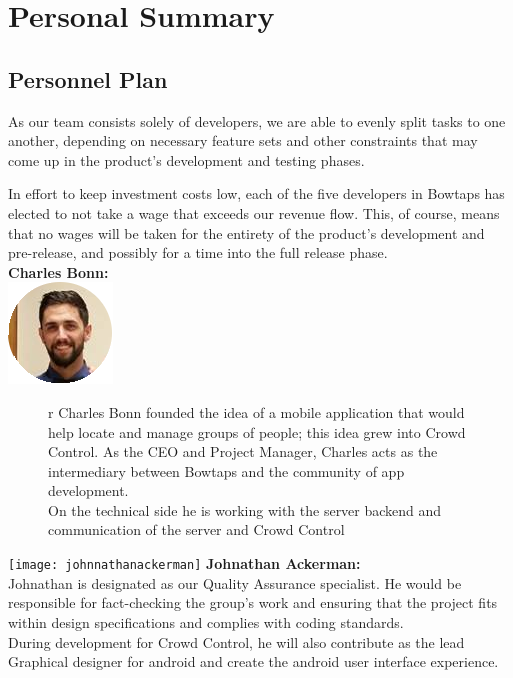 
\graphicspath{ {./Pictures/} }

\chapter{Personal Summary}

\section{Personnel Plan}

As our team consists solely of developers, we are able to evenly split tasks to one another, depending on necessary feature sets and other constraints that may come up in the product’s development and testing phases.

In effort to keep investment costs low, each of the five developers in Bowtaps has elected to not take a wage that exceeds our revenue flow. This, of course, means that no wages will be taken for the entirety of the product’s development and pre-release, and possibly for a time into the full release phase.\\





\noindent
\textbf{Charles Bonn:}\\ 
\includegraphics{charlesbonn}
\begin{figure}{r}
Charles Bonn founded the idea of a mobile application that would help locate and manage groups of people; this idea grew into Crowd Control. As the CEO and Project Manager, Charles acts as the intermediary between Bowtaps and the community of app development. \\
On the technical side he is working with the server backend and communication of the server and Crowd Control \\
\end{figure}

\noindent
\texttt{[image: johnnathanackerman]}
\textbf{Johnathan Ackerman:}\\ Johnathan is designated as our Quality Assurance specialist. He would be responsible for fact-checking the group’s work and ensuring that the project fits within design specifications and complies with coding standards.\\
 During development for Crowd Control, he will also contribute as the lead Graphical designer for android and create the android user interface experience.\\
 
